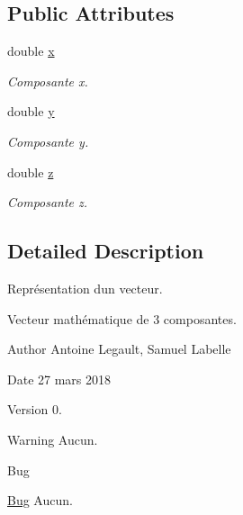\subsection*{Public Attributes}
\begin{DoxyCompactItemize}
\item 
\hypertarget{class_vector3_d_a3c086dfccfc57dd996e9b8600098a430}{}double \hyperlink{class_vector3_d_a3c086dfccfc57dd996e9b8600098a430}{x}\label{class_vector3_d_a3c086dfccfc57dd996e9b8600098a430}

\begin{DoxyCompactList}\small\item\em Composante x. \end{DoxyCompactList}\item 
\hypertarget{class_vector3_d_adcec384756103d26d1181e45d5a0fd78}{}double \hyperlink{class_vector3_d_adcec384756103d26d1181e45d5a0fd78}{y}\label{class_vector3_d_adcec384756103d26d1181e45d5a0fd78}

\begin{DoxyCompactList}\small\item\em Composante y. \end{DoxyCompactList}\item 
\hypertarget{class_vector3_d_a7321f3ff785f275c4d83f7d1b951752a}{}double \hyperlink{class_vector3_d_a7321f3ff785f275c4d83f7d1b951752a}{z}\label{class_vector3_d_a7321f3ff785f275c4d83f7d1b951752a}

\begin{DoxyCompactList}\small\item\em Composante z. \end{DoxyCompactList}\end{DoxyCompactItemize}


\subsection{Detailed Description}
Représentation d\textquotesingle{}un vecteur. 

Vecteur mathématique de 3 composantes. \begin{DoxyAuthor}{Author}
Antoine Legault, Samuel Labelle 
\end{DoxyAuthor}
\begin{DoxyDate}{Date}
27 mars 2018 
\end{DoxyDate}
\begin{DoxyVersion}{Version}
0. 
\end{DoxyVersion}
\begin{DoxyWarning}{Warning}
Aucun. 
\end{DoxyWarning}
\begin{DoxyRefDesc}{Bug}
\item[\hyperlink{bug__bug000021}{Bug}]Aucun. \end{DoxyRefDesc}


